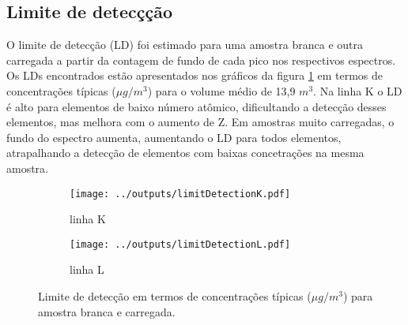 \subsection{Limite de detecçção}

O limite de detecção (LD) foi estimado para uma amostra branca e outra carregada
a partir da contagem de fundo de cada pico nos respectivos espectros.
Os LDs encontrados estão apresentados nos gráficos da figura \ref{table:ld} 
em termos de concentrações típicas ($\mu g / m^3$) para o volume médio 
de 13,9 $m^3$. Na linha K o LD é alto para elementos de baixo número atômico, 
dificultando a detecção desses elementos, mas melhora com o aumento de Z. 
Em amostras muito carregadas, o fundo do espectro aumenta, aumentando o LD para 
todos elementos, atrapalhando a detecção de elementos com baixas concetrações
na mesma amostra. 

\begin{figure}[H]
  \begin{subfigure}[b]{0.5\textwidth}
    \texttt{[image: ../outputs/limitDetectionK.pdf]}
    \caption{linha K}
  \end{subfigure}%
  \begin{subfigure}[b]{0.5\textwidth}
    \texttt{[image: ../outputs/limitDetectionL.pdf]}
    \caption{linha L}
  \end{subfigure}
  \caption{Limite de detecção em termos de concentrações típicas 
           ($\mu g / m^3$) para amostra branca e carregada.
           \label{table:ld}}
\end{figure}
